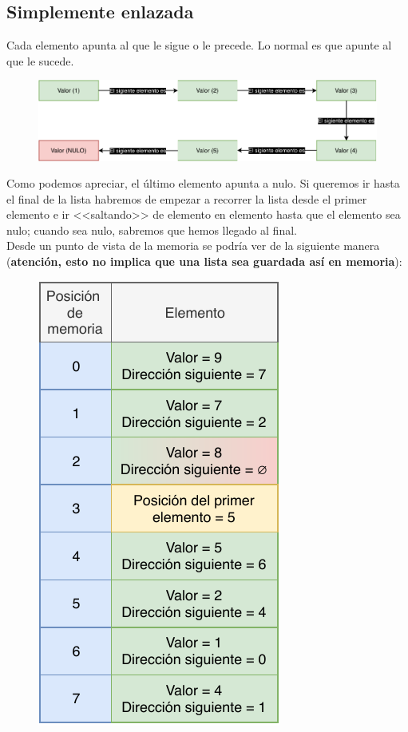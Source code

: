 \documentclass[11pt, oneside]{book}		%
\begin{document}
		\subsection{Simplemente enlazada}
		Cada elemento apunta al que le sigue o le precede. Lo normal es que apunte al que le sucede.
		\begin{figure}[H]
			\centering
			\hspace*{-0.9in}\includegraphics{img/TiposEnumerables/Lista/list1.pdf}
		\end{figure}
		Como podemos apreciar, el último elemento apunta a nulo. Si queremos ir hasta el final de la lista habremos de empezar a recorrer la lista desde el primer elemento e ir <<saltando>> de elemento en elemento hasta que el elemento sea nulo; cuando sea nulo, sabremos que hemos llegado al final.\\
		Desde un punto de vista de la memoria se podría ver de la siguiente manera (\textbf{atención, esto no implica que una lista sea guardada así en memoria}):
		\begin{figure}[H]
			\centering
			\includegraphics{img/TiposEnumerables/Lista/list1-1.pdf}
		\end{figure}
\end{document}
